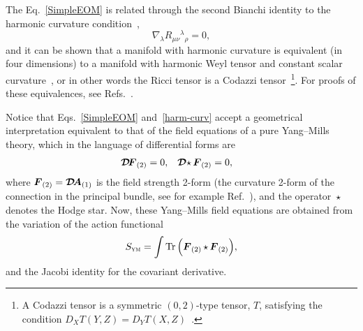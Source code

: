 \documentclass[aps,prd,12pt,twocolumn,superscriptaddress,showpacs,showkeys,reprint%
]{revtex4-1}
\newcommand{\cdf}[1][]{{\boldsymbol{\mathcal{D}}}{#1}\!}
\DeclareMathOperator{\st}{\star}
\newcommand{\Mi}{\mathcal{M}}
\newcommand{\Tr}{\operatorname{Tr}}
\renewcommand{\(}{\left(}
\renewcommand{\)}{\right)}
\renewcommand{\[}{\left[}
\renewcommand{\]}{\right]}
\begin{document}


The Eq.~\eqref{SimpleEOM} is related through the second Bianchi identity to the harmonic curvature condition~\cite{bourguignon1981varietes},
\begin{equation}
  \label{harm-curv}
  \nabla_\lambda R_{\mu\nu}{}^\lambda{}_\rho = 0,
\end{equation}
and it can be shown that a manifold with harmonic curvature is equivalent (in four dimensions) to a manifold with harmonic Weyl tensor and constant scalar curvature~\cite{Berger:1969}, or in other words the Ricci tensor is a Codazzi tensor~\footnote{A Codazzi tensor is a symmetric $(0,2)$-type tensor, $T$, satisfying the condition \mbox{$D_X T(Y,Z) = D_Y T(X,Z)$~\cite{Derdzinski01071983}.}}. For proofs of these equivalences, see Refs.~\cite{Derdzinski:1985,Besse}.

Notice that Eqs.~\eqref{SimpleEOM} and~\eqref{harm-curv} accept a geometrical interpretation equivalent to that of the field equations of a pure Yang--Mills theory, which in the language of differential forms are
\begin{align}
  \cdf \Ff*[2] &= 0, & \cdf \st \Ff*[2] &= 0,
\end{align}
where $\Ff*[2] = \cdf \Af*[1]$ is the field strength 2-form (the curvature 2-form of the connection in the principal bundle, see for example Ref.~\cite{bourguignon1982yang,Nakahara}), and the operator $\st$ denotes the Hodge star. Now, these Yang--Mills field equations are obtained from the variation of the action functional
\begin{equation}
  S_{\textsc{ym}} = \int \Tr \Big( \Ff*[2] \st \Ff*[2] \Big),
\end{equation}
and the Jacobi identity for the covariant derivative.
\end{document}
